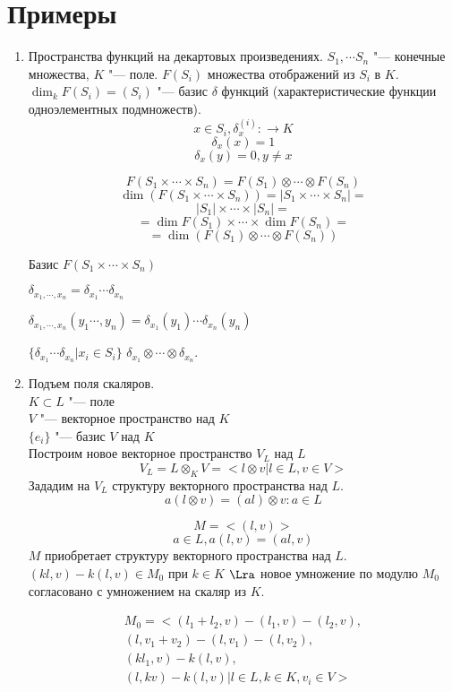 ﻿\section{Примеры}
\begin{enumerate}
    \item Пространства функций на декартовых произведениях. 
    $S_1, \cdots S_n$ "--- конечные множества, $K$ "--- поле. 
    $F(S_i)$ множества отображений из $S_i$ в $K$.
    $\dim_k F(S_i) = (S_i)$ "--- базис $\delta$ функций (характеристические функции одноэлементных подмножеств).
    $$x \in S_i, \delta_{x}^{(i)} \colon \to K$$
    $$\delta_{x}(x) = 1$$
    $$\delta_{x}(y) = 0, y \ne x$$

    $$F(S_1 \times \cdots \times S_n) = F(S_1) \otimes \cdots \otimes F(S_n)$$
    $$\dim(F(S_1 \times \cdots \times S_n)) = |S_1 \times \cdots \times S_n| = $$
    $$|S_1| \times \cdots \times |S_n| = $$
    $$= \dim F(S_1) \times \cdots \times \dim F(S_n) = $$
    $$= \dim (F(S_1) \otimes \cdots \otimes F(S_n))$$

    Базис $F(S_1 \times \cdots \times S_n)$

    $\delta_{x_1, \cdots, x_n} = \delta_{x_1} \cdots \delta_{x_n}$

    $\delta_{x_1, \cdots, x_n}(y_1 \cdots, y_n) = \delta_{x_1}(y_1) \cdots \delta_{x_n}(y_n)$

    $\{\delta_{x_1} \cdots \delta_{x_n}| x_i \in S_i\}$ 
    $\delta_{x_1} \otimes \cdots \otimes \delta_{x_n}$.
\item
Подъем поля скаляров.\\
$K \subset L$ "--- поле\\
$V$ "--- векторное пространство над $K$\\
$\{e_i\}$ "--- базис $V$ над $K$\\
Построим новое векторное пространство $V_L$ над $L$\\
$$V_L = L \otimes_{K} V = < l \otimes v | l \in L, v \in V >$$
Зададим на $V_L$ структуру векторного пространства над $L$.
$$a(l \otimes v) = (al) \otimes v \colon a \in L $$

$$M = <(l, v)>$$
$$a \in L, a(l,v) = (al, v)$$
$M$ приобретает структуру векторного пространства над $L$.
$(kl, v) - k(l, v) \in M_0$ при $k \in K$ $\Lra$ новое умножение 
по модулю $M_0$ согласовано с умножением на скаляр из $K$.

\begin{gather*}
M_0 = <(l_1 + l_2, v) - (l_1, v) - (l_2, v), \\
         (l, v_1 + v_2) - (l, v_1) - (l, v_2), \\
         (kl_1, v) - k(l, v),\\ 
         (l, kv) - k(l, v) | l \in L, k \in K, v_i \in V>
\end{gather*}


\end{enumerate}
